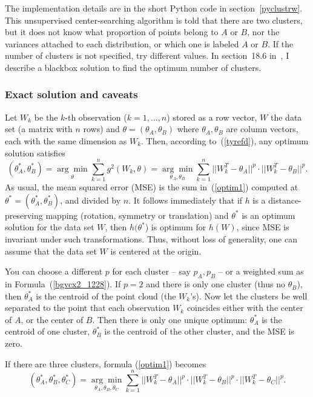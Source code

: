 \documentclass[oneside,10pt]{book}
\begin{document}
The implementation details are in the short
 Python code in section~\ref{pyclustrw}.  This unsupervised center-searching algorithm is told that there are two clusters, but it does not know what proportion of points belong to $A$ or $B$, nor the variances attached to
 each distribution, or which one is labeled $A$ or $B$. If the number of clusters is not specified, try different values. In section~18.6 in~\cite{vgelsevier}, I describe
 a blackbox solution to find the optimum number of clusters. 

\subsubsection{Exact solution and caveats}\label{exact5}

Let $W_k$ be the $k$-th observation ($k=1,\dots,n$) stored as a row vector, $W$ the data set (a matrix with $n$ rows) and $\theta=(\theta_A,\theta_B)$ where $\theta_A,\theta_B$ are column vectors, each with the same dimension as $W_k$. Then, according to~(\ref{tyrefd}),  any optimum solution satisfies
\begin{equation}
(\theta_A^*,\theta_B^*) = \underset{\theta}{\arg\min} \sum_{k=1}^n g^2(W_k,\theta)= \underset{\theta_A,\theta_B}{\arg\min} \sum_{k=1}^n ||W_k^T-\theta_A||^{p} \cdot ||W_k^T-\theta_B||^{p}. \label{optim1}
\end{equation}
 As usual, the \textcolor{index}{mean squared error} (MSE) is the sum in~(\ref{optim1}) computed at $\theta^*=(\theta_A^*,\theta_B^*)$, and divided by $n$. 
It follows immediately that if $h$ is a distance-preserving mapping (rotation, symmetry or translation) and $\theta^*$ is an optimum solution for the data set $W$, then $h(\theta^*$) is optimum for $h(W)$, since MSE is invariant under such transformations. Thus, without loss of generality, one can assume that the data set $W$ is centered at the origin.

You can choose a different $p$ for each cluster -- say $p_A,p_B$ -- or a weighted sum as in Formula~(\ref{bgvcx2_1228}). 
If $p=2$ and there is only one cluster (thus no $\theta_B$), then $\theta_A^*$ is the centroid of the point
 cloud (the $W_k$'s). Now let the clusters be well separated to the point that each observation $W_k$ coincides either with the center of $A$, or the center of $B$. 
Then there is only one unique optimum: $\theta_A^*$ is the centroid of one cluster, $\theta_B^*$ is the centroid of the other cluster, and the MSE is zero.

If there are three clusters, formula (\ref{optim1})  becomes
\begin{equation}
(\theta_A^*,\theta_B^*,\theta_C^*) = \underset{\theta_A,\theta_B,\theta_C}{\arg\min} \sum_{k=1}^n ||W_k^T-\theta_A||^{p} \cdot ||W_k^T-\theta_B||^{p} \cdot ||W_k^T-\theta_C||^{p}. \label{optim2}
\end{equation}
\end{document}
